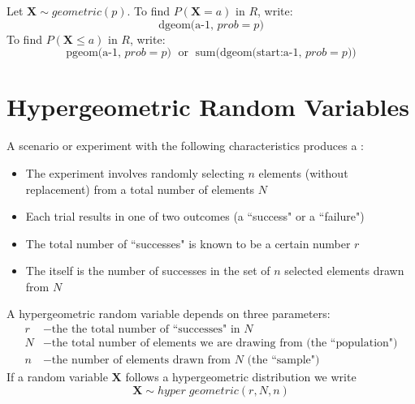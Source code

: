 \documentclass[12pt]{report}
\begin{document}
\begin{defn}{}{}
    Let $\mathbf{X}\sim geometric(p)$. To find $P(\mathbf{X} = a)$ in $R$, write: \begin{equation*}
        \text{dgeom(a-1, $prob = p$)}
    \end{equation*}
    To find $P(\mathbf{X} \leq a)$ in $R$, write: \begin{equation*}
        \text{pgeom(a-1, $prob = p$)}\;\text{ or }\;\text{sum(dgeom(start:a-1, $prob = p$))}
    \end{equation*}
\end{defn}


\section{Hypergeometric Random Variables}

\begin{defn}{}{}
    A scenario or experiment with the following characteristics produces a : \begin{itemize}
        \item The experiment involves randomly selecting $n$ elements (without replacement) from a total number of elements $N$
        \item Each trial results in one of two outcomes (a ``success" or a ``failure")
        \item The total number of ``successes" is known to be a certain number $r$
        \item The  itself is the number of successes in the set of $n$ selected elements drawn from $N$
    \end{itemize}
\end{defn}


\begin{defn}{}{}
    A hypergeometric random variable depends on three parameters: \begin{align*}
        r &- \text{the the total number of ``successes" in $N$} \\
        N &- \text{the total number of elements we are drawing from (the ``population")} \\
        n &- \text{the number of elements drawn from $N$ (the ``sample")}
    \end{align*}
    If a random variable $\mathbf{X}$ follows a hypergeometric distribution we write $$\mathbf{X}\sim hyper\;geometric(r,N,n)$$
\end{defn}
\end{document}
